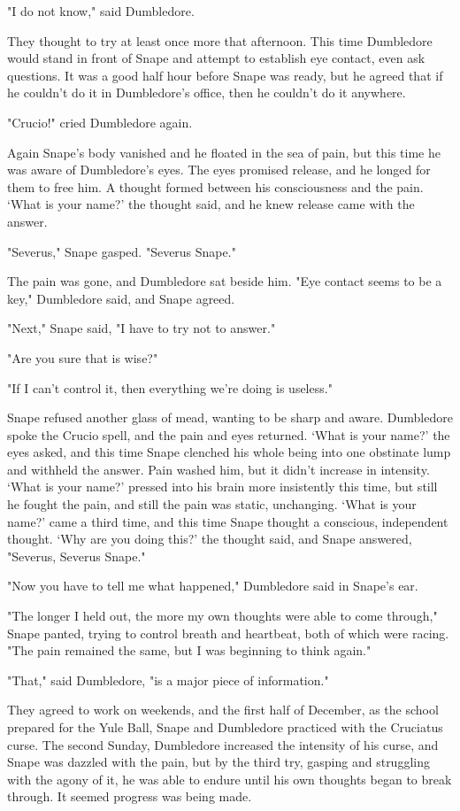 \documentclass[a4paper,11pt]{article}
\begin{document}
"I do not know," said Dumbledore.

They thought to try at least once more that afternoon. This time Dumbledore would stand in front of Snape and attempt to establish eye contact, even ask questions. It was a good half hour before Snape was ready, but he agreed that if he couldn't do it in Dumbledore's office, then he couldn't do it anywhere.

"Crucio!" cried Dumbledore again.

Again Snape's body vanished and he floated in the sea of pain, but this time he was aware of Dumbledore's eyes. The eyes promised release, and he longed for them to free him. A thought formed between his consciousness and the pain. `What is your name?' the thought said, and he knew release came with the answer.

"Severus," Snape gasped. "Severus Snape."

The pain was gone, and Dumbledore sat beside him. "Eye contact seems to be a key," Dumbledore said, and Snape agreed.

"Next," Snape said, "I have to try not to answer."

"Are you sure that is wise?"

"If I can't control it, then everything we're doing is useless."

Snape refused another glass of mead, wanting to be sharp and aware. Dumbledore spoke the Crucio spell, and the pain and eyes returned. `What is your name?' the eyes asked, and this time Snape clenched his whole being into one obstinate lump and withheld the answer. Pain washed him, but it didn't increase in intensity. `What is your name?' pressed into his brain more insistently this time, but still he fought the pain, and still the pain was static, unchanging. `What is your name?' came a third time, and this time Snape thought a conscious, independent thought. `Why are you doing this?' the thought said, and Snape answered, "Severus, Severus Snape."

"Now you have to tell me what happened," Dumbledore said in Snape's ear.

"The longer I held out, the more my own thoughts were able to come through," Snape panted, trying to control breath and heartbeat, both of which were racing. "The pain remained the same, but I was beginning to think again."

"That," said Dumbledore, "is a major piece of information."

They agreed to work on weekends, and the first half of December, as the school prepared for the Yule Ball, Snape and Dumbledore practiced with the Cruciatus curse. The second Sunday, Dumbledore increased the intensity of his curse, and Snape was dazzled with the pain, but by the third try, gasping and struggling with the agony of it, he was able to endure until his own thoughts began to break through. It seemed progress was being made.
\end{document}
